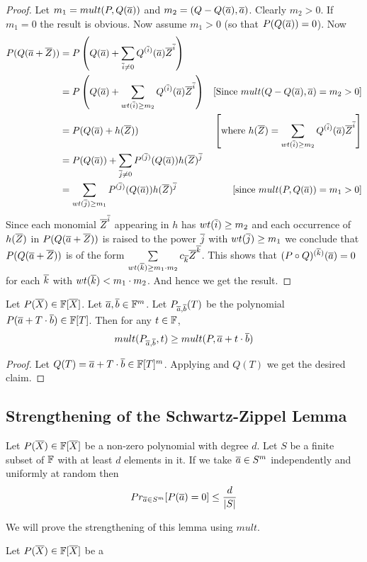 \begin{proof}
	Let $m_1=mult(P,Q(\overline{a}))$ and $m_2=(Q-Q(\overline{a}),\overline{a})$. Clearly $m_2>0$. If $m_1=0$ the result is obvious. Now assume $m_1>0$ (so that $P(Q(\overline{a}))=0$). Now\begin{align*}
		P(Q(\overline{a}+\overline{Z})) & = P\left(Q(\overline{a})+\sum_{\overline{i}\neq 0}Q^{(\overline{i})}(\overline{a})\overline{Z}^{\overline{i}}  \right)\\
		& = P\left(Q(\overline{a})+\sum_{wt(\overline{i})\geq m_2}Q^{(\overline{i})}(\overline{a})\overline{Z}^{\overline{i}}  \right)  & [\text{Since $mult(Q-Q(\overline{a}),\overline{a})=m_2>0$}]\\
		& = P(Q(\overline{a})+h(\overline{Z})) & \left[\text{where $h(\overline{Z})=\sum\limits_{wt(\overline{i})\geq m_2}Q^{(\overline{i})}(\overline{a})\overline{Z}^{\overline{i}}$}  \right]\\
		& = P(Q(\overline{a}))+\sum_{\overline{j}\neq 0}P^{(\overline{j})}(Q(\overline{a}))h(\overline{Z})^{\overline{j}}\\
		& = \sum_{wt(\overline{j})\geq m_1}P^{(\overline{j})}(Q(\overline{a}))h(\overline{Z})^{\overline{j}} & [\text{since $mult(P,Q(\overline{a}))=m_1>0$}]
	\end{align*}
	Since each monomial $\overline{Z}^{\overline{i}}$ appearing in $h$ has $wt(\overline{i})\geq m_2$ and each occurrence of $h(\overline{Z})$ in $P(Q(\overline{a}+\overline{Z}))$ is raised to the power $\overline{j}$ with $wt(\overline{j})\geq m_1$ we conclude that $P(Q(\overline{a}+\overline{Z}))$ is of the form $\sum\limits_{wt(\overline{k})\geq m_1\cdot m_2}c_{\overline{k}}\overline{Z}^{\overline{k}}$. This shows that $(P\circ Q)^{(\overline{k})}(\overline{a})=0$ for each $\overline{k}$ with $wt(\overline{k})<m_1\cdot m_2$. And hence we get the result.
\end{proof}
\begin{corollary}
	Let $P(\overline{X})\in \mathbb{F}[\overline{X}]$. Let $\overline{a},\overline{b}\in \mathbb{F}^m$. Let $P_{\overline{a},\overline{b}}(T)$ be the polynomial $P(\overline{a}+T\cdot \overline{b})\in \mathbb{F}[T]$. Then for any $t\in \mathbb{F}$, $$mult(P_{\overline{a},\overline{b}},t)\geq mult(P,\overline{a}+t\cdot \overline{b})$$
\end{corollary}
\begin{proof}
	Let $Q(T)=\overline{a}+T\cdot \overline{b}\in \mathbb{F}[T]^m$. Applying  and $Q(T)$ we get the desired claim. 
\end{proof}
\subsection{Strengthening of the Schwartz-Zippel Lemma}
\begin{theorem}\label{schwartzzippel}
	Let $P(\overline{X})\in \mathbb{F}[\overline{X}]$ be a non-zero polynomial with degree $d$. Let $S$ be a finite subset of $\mathbb{F}$ with at least $d$ elements in it. If we take $\overline{a}\in S^m$ independently and uniformly at random then $$Pr_{\overline{a}\in S^m}[P(\overline{a})=0]\leq \frac{d}{|S|}$$
\end{theorem}
We will prove the strengthening of this lemma using $mult$.
\begin{theorem}
	Let $P(\overline{X})\in \mathbb{F}[\overline{X}]$ be a
\end{theorem}



